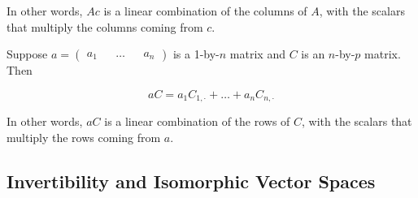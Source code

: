 In other words, $Ac$ is a linear combination of the columns of $A$,
with the scalars that multiply the columns coming from $c$.

\begin{theorem}
   Suppose $a = \begin{pmatrix*} a_1 && \dots && a_n \end{pmatrix*}$ is
   a 1-by-$n$ matrix and $C$ is an $n$-by-$p$ matrix. Then

   \[ aC = a_1 C_{1, \cdot} + \dots + a_n C_{n, \cdot} \]
\end{theorem}

In other words, $aC$ is a linear combination of the rows of $C$,
with the scalars that multiply the rows coming from $a$.

\subsection{Invertibility and Isomorphic Vector Spaces}


\endinput